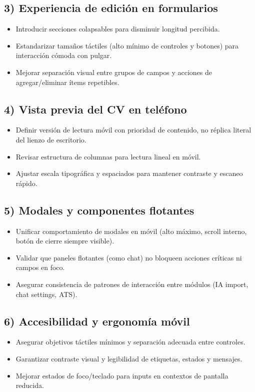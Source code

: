 \documentclass[12pt,a4paper]{article}
\begin{document}
\subsection{3) Experiencia de edición en formularios}
\begin{itemize}[leftmargin=1.2cm]
  \item Introducir secciones colapsables para disminuir longitud percibida.
  \item Estandarizar tamaños táctiles (alto mínimo de controles y botones) para interacción cómoda con pulgar.
  \item Mejorar separación visual entre grupos de campos y acciones de agregar/eliminar ítems repetibles.
\end{itemize}

\subsection{4) Vista previa del CV en teléfono}
\begin{itemize}[leftmargin=1.2cm]
  \item Definir versión de lectura móvil con prioridad de contenido, no réplica literal del lienzo de escritorio.
  \item Revisar estructura de columnas para lectura lineal en móvil.
  \item Ajustar escala tipográfica y espaciados para mantener contraste y escaneo rápido.
\end{itemize}

\subsection{5) Modales y componentes flotantes}
\begin{itemize}[leftmargin=1.2cm]
  \item Unificar comportamiento de modales en móvil (alto máximo, scroll interno, botón de cierre siempre visible).
  \item Validar que paneles flotantes (como chat) no bloqueen acciones críticas ni campos en foco.
  \item Asegurar consistencia de patrones de interacción entre módulos (IA import, chat settings, ATS).
\end{itemize}

\subsection{6) Accesibilidad y ergonomía móvil}
\begin{itemize}[leftmargin=1.2cm]
  \item Asegurar objetivos táctiles mínimos y separación adecuada entre controles.
  \item Garantizar contraste visual y legibilidad de etiquetas, estados y mensajes.
  \item Mejorar estados de foco/teclado para inputs en contextos de pantalla reducida.
\end{itemize}
\end{document}
